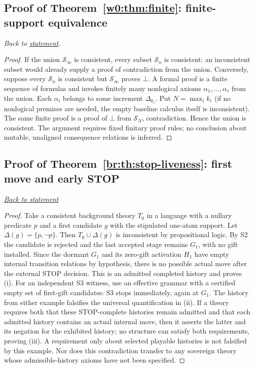 \documentclass[11pt,letterpaper]{article}
\theoremstyle{definition}\newtheorem{definition}[theorem]{Definition}\newtheorem{example}[theorem]{Example}
\theoremstyle{remark}\newtheorem{remark}[theorem]{Remark}
\newcommand{\Stage}{\mathcal{S}}
\newcommand{\backlink}[1]{\noindent\hyperref[#1]{\textit{Back to statement}}\par\smallskip}
\begin{document}
\subsection{Proof of Theorem~\ref{w0:thm:finite}: finite-support equivalence}\label{w0:pr:finite}
\textit{Back to \hyperref[w0:thm:finite]{statement}.}
\begin{proof}
If the union $\Stage_\infty$ is consistent, every subset $\Stage_n$ is consistent: an inconsistent subset would already supply a proof of contradiction from the union. Conversely, suppose every $\Stage_n$ is consistent but $\Stage_\infty$ proves $\bot$. A formal proof is a finite sequence of formulas and invokes finitely many nonlogical axioms $\alpha_1,\ldots,\alpha_r$ from the union. Each $\alpha_i$ belongs to some increment $\Delta_{k_i}$. Put $N=\max_i k_i$ (if no nonlogical premises are needed, the empty baseline calculus itself is inconsistent). The same finite proof is a proof of $\bot$ from $\Stage_N$, contradiction. Hence the union is consistent. The argument requires fixed finitary proof rules; no conclusion about mutable, unaligned consequence relations is inferred.
\end{proof}


\subsection{Proof of Theorem~\ref{br:th:stop-liveness}: first move and early STOP}\label{br:pr:stop-liveness}
\backlink{br:th:stop-liveness}
\begin{proof}
Take a consistent background theory $T_0$ in a language with a nullary
predicate $p$ and a first candidate $g$ with the stipulated one-atom support.
Let $\Delta(g)=\{p,\neg p\}$. Then $T_0\cup\Delta(g)$ is inconsistent
by propositional logic. By S2 the candidate is rejected and the last
accepted stage remains $G_1$, with no gift installed. Since the dormant
$G_1$ and its zero-gift activation $H_1$ have empty internal transition
relations by hypothesis, there is no possible actual move after the external
STOP decision. This is an admitted completed history and proves (i). For
an independent S3 witness, use an effective grammar with a certified empty
set of first-gift candidates: S3 stops immediately, again at $G_1$.
The history from either example falsifies the universal quantification in
(ii). If a theory requires both that these STOP-complete histories remain
admitted and that each admitted history contains an actual internal move,
then it asserts the latter and its negation for the exhibited history; no
structure can satisfy both requirements, proving (iii). A requirement only
about selected playable histories is not falsified by this example. Nor does
this contradiction transfer to any sovereign theory whose admissible-history
axioms have not been specified.
\end{proof}
\end{document}
